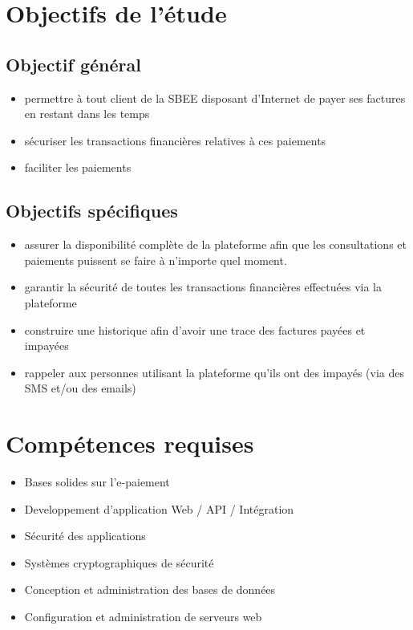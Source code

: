 \documentclass[a4paper,11pt]{article}
\begin{document}
\section{Objectifs de l'étude}
  \subsection{Objectif général}
    \begin{itemize}
      \item permettre \`a tout client de la SBEE disposant d'Internet de payer ses factures en restant dans les temps
      \item s\'ecuriser les transactions financi\`eres relatives \`a ces paiements
      \item faciliter les paiements
    \end{itemize}

  \subsection{Objectifs sp\'ecifiques}
    \begin{itemize}
      \item assurer la disponibilit\'e compl\`ete de la plateforme afin que les consultations et paiements puissent se faire \`a n'importe quel moment.
      \item garantir la s\'ecurit\'e de toutes les transactions financi\`eres effectu\'ees via la plateforme
      \item construire une historique afin d'avoir une trace des factures pay\'ees et impay\'ees
      \item rappeler aux personnes utilisant la plateforme qu'ils ont des impay\'es (via des SMS et/ou des emails)
    \end{itemize}

\section{Comp\'etences requises}
   \begin{itemize}
     \item Bases solides sur l'e-paiement
     \item Developpement d'application Web / API / Int\'egration
     \item Sécurité des applications
     \item Systèmes cryptographiques de sécurité
     \item Conception et administration des bases de données
     \item Configuration et administration de serveurs web
   \end{itemize}
\end{document}

